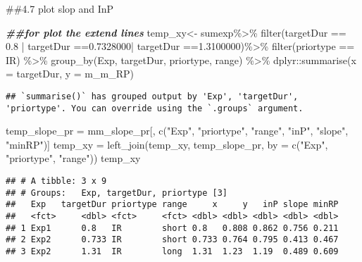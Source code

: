\documentclass[
]{article}
\newenvironment{Shaded}{\begin{snugshade}}{\end{snugshade}}
\newcommand{\AttributeTok}[1]{\textcolor[rgb]{0.77,0.63,0.00}{#1}}
\newcommand{\DocumentationTok}[1]{\textcolor[rgb]{0.56,0.35,0.01}{\textbf{\textit{#1}}}}
\newcommand{\FloatTok}[1]{\textcolor[rgb]{0.00,0.00,0.81}{#1}}
\newcommand{\FunctionTok}[1]{\textcolor[rgb]{0.00,0.00,0.00}{#1}}
\newcommand{\NormalTok}[1]{#1}
\newcommand{\OtherTok}[1]{\textcolor[rgb]{0.56,0.35,0.01}{#1}}
\newcommand{\SpecialCharTok}[1]{\textcolor[rgb]{0.00,0.00,0.00}{#1}}
\newcommand{\StringTok}[1]{\textcolor[rgb]{0.31,0.60,0.02}{#1}}
\begin{document}
\#\#4.7 plot slop and InP

\begin{Shaded}
\begin{Highlighting}[]
\DocumentationTok{\#\#for plot the extend lines}
\NormalTok{temp\_xy}\OtherTok{\textless{}{-}}\NormalTok{ sumexp}\SpecialCharTok{\%\textgreater{}\%} \FunctionTok{filter}\NormalTok{(targetDur }\SpecialCharTok{==} \FloatTok{0.8}  \SpecialCharTok{|}\NormalTok{ targetDur }\SpecialCharTok{==}\FloatTok{0.7328000}\SpecialCharTok{|}\NormalTok{ targetDur }\SpecialCharTok{==}\FloatTok{1.3100000}\NormalTok{)}\SpecialCharTok{\%\textgreater{}\%} \FunctionTok{filter}\NormalTok{(priortype }\SpecialCharTok{==} \StringTok{\textquotesingle{}IR\textquotesingle{}}\NormalTok{) }\SpecialCharTok{\%\textgreater{}\%} \FunctionTok{group\_by}\NormalTok{(Exp, targetDur, priortype, range) }\SpecialCharTok{\%\textgreater{}\%}
\NormalTok{  dplyr}\SpecialCharTok{::}\FunctionTok{summarise}\NormalTok{(}\AttributeTok{x =}\NormalTok{ targetDur,}
                   \AttributeTok{y =}\NormalTok{ m\_m\_RP)}
\end{Highlighting}
\end{Shaded}

\begin{verbatim}
## `summarise()` has grouped output by 'Exp', 'targetDur', 'priortype'. You can override using the `.groups` argument.
\end{verbatim}

\begin{Shaded}
\begin{Highlighting}[]
\NormalTok{temp\_slope\_pr }\OtherTok{=}\NormalTok{ mm\_slope\_pr[, }\FunctionTok{c}\NormalTok{(}\StringTok{"Exp"}\NormalTok{, }\StringTok{"priortype"}\NormalTok{, }\StringTok{"range"}\NormalTok{, }\StringTok{"inP"}\NormalTok{, }\StringTok{"slope"}\NormalTok{, }\StringTok{"minRP"}\NormalTok{)]}
\NormalTok{temp\_xy }\OtherTok{=} \FunctionTok{left\_join}\NormalTok{(temp\_xy, temp\_slope\_pr, }\AttributeTok{by =} \FunctionTok{c}\NormalTok{(}\StringTok{"Exp"}\NormalTok{, }\StringTok{"priortype"}\NormalTok{, }\StringTok{"range"}\NormalTok{))}
\NormalTok{temp\_xy}
\end{Highlighting}
\end{Shaded}

\begin{verbatim}
## # A tibble: 3 x 9
## # Groups:   Exp, targetDur, priortype [3]
##   Exp   targetDur priortype range     x     y   inP slope minRP
##   <fct>     <dbl> <fct>     <fct> <dbl> <dbl> <dbl> <dbl> <dbl>
## 1 Exp1      0.8   IR        short 0.8   0.808 0.862 0.756 0.211
## 2 Exp2      0.733 IR        short 0.733 0.764 0.795 0.413 0.467
## 3 Exp2      1.31  IR        long  1.31  1.23  1.19  0.489 0.609
\end{verbatim}
\end{document}
